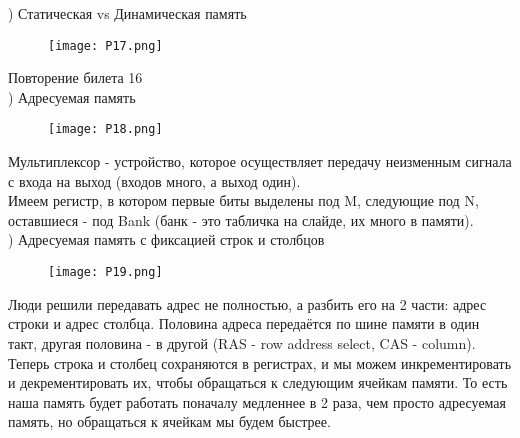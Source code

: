 ) Статическая vs Динамическая память \\
\begin{figure}[H]
    \centering
    \texttt{[image: P17.png]}
\end{figure}
\noindent Повторение билета 16 \\
\newpage
{}) Адресуемая память \\
\begin{figure}[H]
    \centering
    \texttt{[image: P18.png]}
\end{figure}
\noindent Мультиплексор - устройство, которое осуществляет передачу неизменным сигнала с входа на выход (входов много, а выход один). \\
Имеем регистр, в котором первые биты выделены под M, следующие под N, оставшиеся - под Bank (банк - это табличка на слайде, их много в памяти). \\

) Адресуемая память с фиксацией строк и столбцов \\
\begin{figure}[H]
    \centering
    \texttt{[image: P19.png]}
\end{figure}
\noindent Люди решили передавать адрес не полностью, а разбить его на 2 части: адрес строки и адрес столбца. Половина адреса передаётся по шине памяти в один такт, другая половина - в другой (RAS - row address select, CAS - column). Теперь строка и столбец сохраняются в регистрах, и мы можем инкрементировать и декрементировать их, чтобы обращаться к следующим ячейкам памяти. То есть наша память будет работать поначалу медленнее в 2 раза, чем просто адресуемая память, но обращаться к ячейкам мы будем быстрее. \\
 

